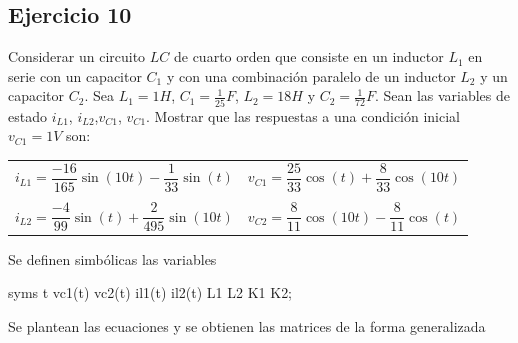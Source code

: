 \documentclass[10pt,a4paper]{article} %
\begin{document}
	\subsection{Ejercicio 10} Considerar un circuito $LC$ de cuarto orden que consiste en un inductor $L_1$ en serie con un capacitor $C_1$ y con una combinación paralelo de un inductor $L_2$ y un capacitor $C_2$. Sea $L_1=1H$, $C_1=\frac{1}{25}F$, $L_2=18H$ y $C_2=\frac{1}{72}F$. Sean las variables de estado $i_{L1}$, $i_{L2}$,$v_{C1}$, $v_{C1}$. Mostrar que las respuestas a una condición inicial $v_{C1}=1V$ son:
	\begin{center}
		\begin{tabular}{cc}
			$i_{L1}=\dfrac{-16}{165}\sin(10t)-\dfrac{1}{33}\sin(t)$& $v_{C1}=\dfrac{25}{33}\cos(t)+\dfrac{8}{33}\cos(10t)$\\
			&\\ 
			$i_{L2}=\dfrac{-4}{99}\sin(t)+\dfrac{2}{495}\sin(10t)$ & $v_{C2}=\dfrac{8}{11}\cos(10t)-\dfrac{8}{11}\cos(t)$\\
		\end{tabular} 
	\end{center}
\begin{par}
	\begin{flushleft}
		Se definen simbólicas las variables
	\end{flushleft}
\end{par}

\begin{matlabcode}
	syms t vc1(t) vc2(t) il1(t) il2(t) L1 L2 K1 K2;
\end{matlabcode}

\begin{par}
	\begin{flushleft}
		Se plantean las ecuaciones y se obtienen las matrices de la forma generalizada
	\end{flushleft}
\end{par}
\end{document}
